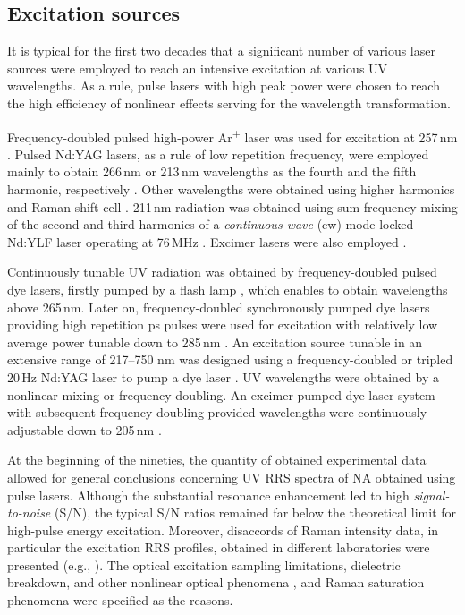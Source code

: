 \subsection{Excitation sources}

It is typical for the first two decades that a significant number of various
laser sources were employed to reach an intensive excitation at various UV
wavelengths.
As a rule, pulse lasers with high peak power were chosen to reach the high
efficiency of nonlinear effects serving for the wavelength transformation.

Frequency-doubled pulsed high-power Ar\textsuperscript{+} laser was used for
excitation at 257\,nm
\parencite{%
	Harada1975,%
	Pezolet1975,%
	Nishimura1977%
}.
Pulsed Nd:YAG lasers, as a rule of low repetition frequency, were employed
mainly to obtain 266\,nm or 213\,nm wavelengths as the fourth and the fifth
harmonic, respectively
\parencite{%
	Ziegler1981,%
	Toyama1993%
}.
Other wavelengths were obtained using higher harmonics
\parencite{Kubasek1985}
and  Raman shift cell
\parencite{%
	Fodor1985,%
	Nishimura1987%
}.
211\,nm radiation was obtained using sum-frequency mixing of the second and
third harmonics of a
\emph{continuous-wave} (cw)
mode-locked Nd:YLF laser operating at 76\,MHz
\parencite{Leonard1994}.
Excimer lasers were also employed
\parencite{Ziegler1983}.

Continuously tunable UV radiation was obtained by frequency-doubled pulsed dye
lasers, firstly pumped by a flash lamp
\parencite{%
	Asher1977,%
	Blazej1977%
},
which enables to obtain wavelengths above 265\,nm.
Later on, frequency-doubled synchronously pumped dye lasers providing high
repetition ps pulses were used for excitation with relatively low average
power tunable down to 285\,nm
\parencite{%
	Bushaw1978,%
	Samanta1982,%
	Benson1992%
}.
An excitation source tunable in an extensive range of 217–750 nm was designed
using a frequency-doubled or tripled 20\,Hz Nd:YAG laser to pump a dye laser
\parencite{Asher1983}.
UV wavelengths were obtained by a nonlinear mixing or frequency doubling.
An excimer-pumped dye-laser system with subsequent frequency doubling provided
wavelengths were continuously adjustable down to 205\,nm
\parencite{Gfrorer1993a}.

At the beginning of the nineties, the quantity of obtained experimental
data allowed for general conclusions concerning UV RRS spectra of NA
obtained using pulse lasers.
Although the substantial resonance enhancement led to high
\emph{signal-to-noise} (S/N), the typical S/N ratios remained far below the
theoretical limit for high-pulse energy excitation.
Moreover, disaccords of Raman intensity data, in particular the excitation RRS
profiles, obtained in different laboratories were presented (e.g.,
\cite{Bushaw1980}).
The optical excitation sampling limitations, dielectric breakdown, and other
nonlinear optical phenomena
\parencite{Teraoka1990},
and Raman saturation phenomena
\parencite{%
	Harmon1990,%
	Johnson1986,%
	Ludwig1988a,%
	Song1991a,%
	Sweeney1990,%
	Teraoka1990%
}
were specified as the reasons.

